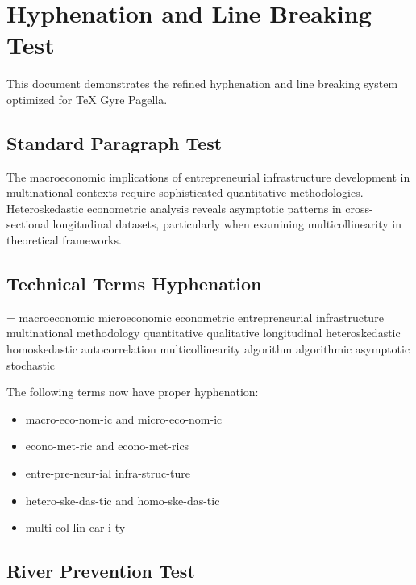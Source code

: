 \documentclass[11pt,a4paper]{article}
\renewcommand{\showhyphens}[1]{%
  \setbox0\vbox{%
    \hsize=0pt
    \hfuzz=\maxdimen
    \noindent#1%
  }%
}
\begin{document}
\section{Hyphenation and Line Breaking Test}

This document demonstrates the refined hyphenation and line breaking system optimized for TeX Gyre Pagella.

\subsection{Standard Paragraph Test}

The macroeconomic implications of entrepreneurial infrastructure development in multinational contexts require sophisticated quantitative methodologies. Heteroskedastic econometric analysis reveals asymptotic patterns in cross-sectional longitudinal datasets, particularly when examining multicollinearity in theoretical frameworks.

\subsection{Technical Terms Hyphenation}

\showhyphens{macroeconomic microeconomic econometric entrepreneurial infrastructure multinational methodology quantitative qualitative longitudinal heteroskedastic homoskedastic autocorrelation multicollinearity algorithm algorithmic asymptotic stochastic}

The following terms now have proper hyphenation:
\begin{itemize}
\item macro-eco-nom-ic and micro-eco-nom-ic
\item econo-met-ric and econo-met-rics
\item entre-pre-neur-ial infra-struc-ture
\item hetero-ske-das-tic and homo-ske-das-tic
\item multi-col-lin-ear-i-ty
\end{itemize}

\subsection{River Prevention Test}

\end{document}
